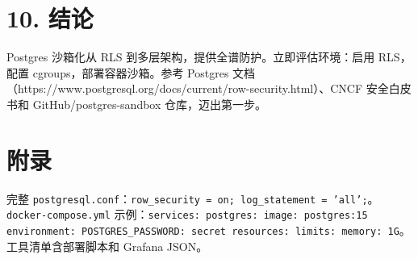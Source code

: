 \chapter{10. 结论}
Postgres 沙箱化从 RLS 到多层架构，提供全谱防护。立即评估环境：启用 RLS，配置 cgroups，部署容器沙箱。参考 Postgres 文档（https://www.postgresql.org/docs/current/row-security.html）、CNCF 安全白皮书和 GitHub/postgres-sandbox 仓库，迈出第一步。\par
\chapter{附录}
完整 \texttt{postgresql.conf}：\texttt{row\_{}security = on; log\_{}statement = 'all';}。\texttt{docker-compose.yml} 示例：\texttt{services: postgres: image: postgres:15 environment: POSTGRES\_{}PASSWORD: secret resources: limits: memory: 1G}。工具清单含部署脚本和 Grafana JSON。\par
